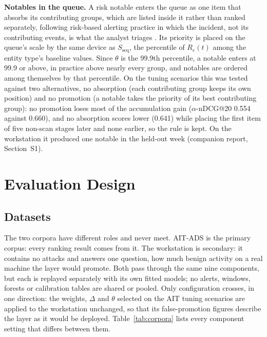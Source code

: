 \documentclass[conference]{IEEEtran}
\begin{document}
\textbf{Notables in the queue.} A risk notable enters the queue as one item that absorbs its contributing groups, which are listed inside it rather than ranked separately, following risk-based alerting practice in which the incident, not its contributing events, is what the analyst triages \cite{ref19}. Its priority is placed on the queue's scale by the same device as $S_\mathrm{seq}$, the percentile of $R_e(t)$ among the entity type's baseline values. Since $\theta$ is the 99.9th percentile, a notable enters at 99.9 or above, in practice above nearly every group, and notables are ordered among themselves by that percentile. On the tuning scenarios this was tested against two alternatives, no absorption (each contributing group keeps its own position) and no promotion (a notable takes the priority of its best contributing group): no promotion loses most of the accumulation gain ($\alpha$-nDCG@20 0.554 against 0.660), and no absorption scores lower (0.641) while placing the first item of five non-scan stages later and none earlier, so the rule is kept. On the workstation it produced one notable in the held-out week (companion report, Section~S1).

\section{Evaluation Design}
\label{sec:eval}

\subsection{Datasets}

The two corpora have different roles and never meet. AIT-ADS is the primary corpus: every ranking result comes from it. The workstation is secondary: it contains no attacks and answers one question, how much benign activity on a real machine the layer would promote. Both pass through the same nine components, but each is replayed separately with its own fitted models; no alerts, windows, forests or calibration tables are shared or pooled. Only configuration crosses, in one direction: the weights, $\Delta$ and $\theta$ selected on the AIT tuning scenarios are applied to the workstation unchanged, so that its false-promotion figures describe the layer as it would be deployed. Table~\ref{tab:corpora} lists every component setting that differs between them.
\end{document}
